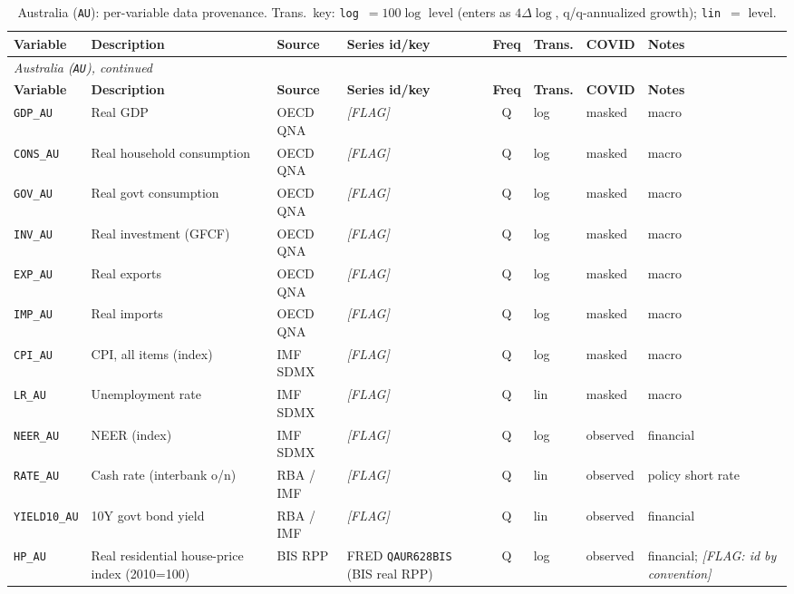 {\small
\begin{longtable}{@{}lp{2.9cm}p{1.9cm}p{2.0cm}cp{1.4cm}p{1.7cm}p{2.6cm}@{}}
\caption{Australia (\texttt{AU}): per-variable data provenance. Trans.\ key:
\texttt{log}~$=100\log$ level (enters as $4\Delta\log$, q/q-annualized growth);
\texttt{lin}~$=$ level.}\label{tab:data:AU}\\
\toprule
\textbf{Variable} & \textbf{Description} & \textbf{Source} & \textbf{Series id/key} & \textbf{Freq} & \textbf{Trans.} & \textbf{COVID} & \textbf{Notes}\\
\midrule
\endfirsthead
\multicolumn{8}{l}{\small\itshape Australia (\texttt{AU}), continued}\\
\toprule
\textbf{Variable} & \textbf{Description} & \textbf{Source} & \textbf{Series id/key} & \textbf{Freq} & \textbf{Trans.} & \textbf{COVID} & \textbf{Notes}\\
\midrule
\endhead
\bottomrule
\endfoot
\texttt{GDP\_AU} & Real GDP & OECD QNA & \textit{[FLAG]} & Q & log & masked & macro\\
\texttt{CONS\_AU} & Real household consumption & OECD QNA & \textit{[FLAG]} & Q & log & masked & macro\\
\texttt{GOV\_AU} & Real govt consumption & OECD QNA & \textit{[FLAG]} & Q & log & masked & macro\\
\texttt{INV\_AU} & Real investment (GFCF) & OECD QNA & \textit{[FLAG]} & Q & log & masked & macro\\
\texttt{EXP\_AU} & Real exports & OECD QNA & \textit{[FLAG]} & Q & log & masked & macro\\
\texttt{IMP\_AU} & Real imports & OECD QNA & \textit{[FLAG]} & Q & log & masked & macro\\
\texttt{CPI\_AU} & CPI, all items (index) & IMF SDMX & \textit{[FLAG]} & Q & log & masked & macro\\
\texttt{LR\_AU} & Unemployment rate & IMF SDMX & \textit{[FLAG]} & Q & lin & masked & macro\\
\texttt{NEER\_AU} & NEER (index) & IMF SDMX & \textit{[FLAG]} & Q & log & observed & financial\\
\texttt{RATE\_AU} & Cash rate (interbank o/n) & RBA / IMF & \textit{[FLAG]} & Q & lin & observed & policy short rate\\
\texttt{YIELD10\_AU} & 10Y govt bond yield & RBA / IMF & \textit{[FLAG]} & Q & lin & observed & financial\\
\texttt{HP\_AU} & Real residential house-price index (2010=100) & BIS RPP & FRED \texttt{QAUR628BIS} (BIS real RPP) & Q & log & observed & financial; \textit{[FLAG: id by convention]}\\

\end{longtable}}
